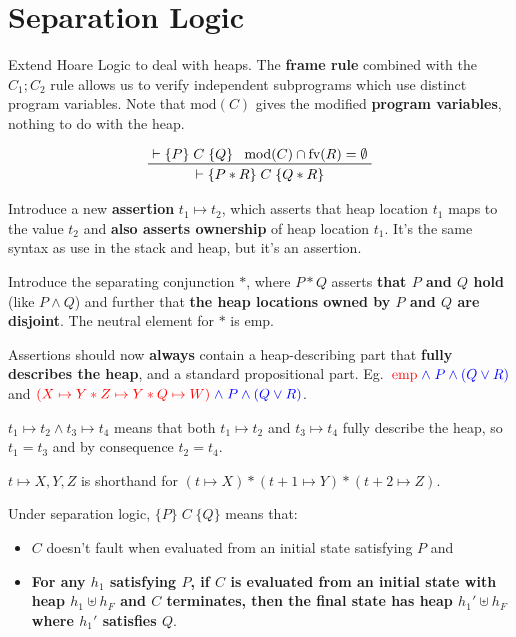 \documentclass[a4paper, 11pt]{article}
\newcommand{\triple}[3]{\{#1\}\;#2\;\{#3\}}
\newcommand{\triplem}[3]{\(\triple{#1}{#2}{#3}\)}
\begin{document}
\section*{Separation Logic}
{
    Extend Hoare Logic to deal with heaps. The \textbf{frame rule} combined with the \(C_1;C_2\) rule allows us to verify independent subprograms which use distinct program variables. Note that \(\text{mod}(C)\) gives the modified \textbf{program variables}, nothing to do with the heap.

    \begin{gather*}
    \prftree[r]{}
    {\vdash\triple{P}{C}{Q}}
    {\text{mod}(C) \cap \text{fv}(R) = \emptyset}
    {\vdash\triple{P * R}{C}{Q * R}}
    \end{gather*}

    Introduce a new \textbf{assertion} \(t_1 \mapsto t_2\), which asserts that heap location \(t_1\) maps to the value \(t_2\) and \textbf{also asserts ownership} of heap location \(t_1\). It's the same syntax as use in the stack and heap, but it's an assertion.

    Introduce the separating conjunction \(*\), where \(P * Q\) asserts \textbf{that \(P\) and \(Q\) hold} (like \(P \wedge Q\)) and further that \textbf{the heap locations owned by \(P\) and \(Q\) are disjoint}. The neutral element for \(*\) is \(\text{emp}\).

    Assertions should now \textbf{always} contain a heap-describing part that \textbf{fully describes the heap}, and a standard propositional part. Eg.\ \(\textcolor{red}{\text{emp}}\textcolor{blue}{\;\wedge\;P \wedge (Q \vee R)}\) and \(\textcolor{red}{(X \mapsto Y * Z \mapsto Y * Q \mapsto W)} \textcolor{blue}{\;\wedge\;P \wedge (Q \vee R)}\).

    \(t_1 \mapsto t_2 \wedge t_3 \mapsto t_4\) means that both \(t_1 \mapsto t_2\) and \(t_3 \mapsto t_4\) fully describe the heap, so \(t_1 = t_3\) and by consequence \(t_2 = t_4\).

    \(t \mapsto X,Y,Z\) is shorthand for \((t \mapsto X) * (t+1 \mapsto Y) * (t+2 \mapsto Z)\).

    Under separation logic, \triplem{P}{C}{Q} means that:
    \begin{itemize}
    \item \(C\) doesn't fault when evaluated from an initial state satisfying \(P\) and
    \item \textbf{For any \(h_1\) satisfying \(P\), if \(C\) is evaluated from an initial state with heap \(h_1 \uplus h_F\) and \(C\) terminates, then the final state has heap \(h_1' \uplus h_F\) where \(h_1'\) satisfies \(Q\)}.
    \end{itemize}

}
\end{document}
